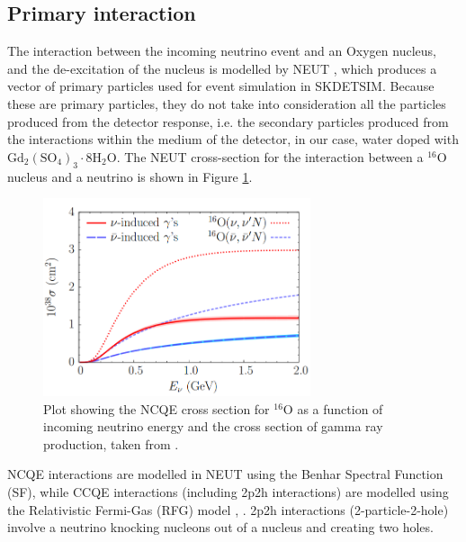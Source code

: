 \subsection{Primary interaction}

The interaction between the incoming neutrino event and an Oxygen nucleus, and the de-excitation of the nucleus is modelled by NEUT \cite{abe2014measurement}, which produces a vector of primary particles used for event simulation in SKDETSIM. Because these are primary particles, they do not take into consideration all the particles produced from the detector response, i.e. the secondary particles produced from the interactions within the medium of the detector, in our case, water doped with $\mathrm{Gd}_{2}\left(\mathrm{SO}_{4}\right)_{3} \cdot 8 \mathrm{H}_{2} \mathrm{O}$. The NEUT cross-section for the interaction between a ${ }^{16} \mathrm{O}$ nucleus and a neutrino is shown in Figure \ref{fig:neutrinonuc}. 

\begin{figure}[htp]
    \centering
    \includegraphics[width=0.7\textwidth]{Figures/neutrinonuc.png}
    \caption{Plot showing the NCQE cross section for ${ }^{16} \mathrm{O}$ as a function of incoming neutrino energy and the cross section of gamma ray production, taken from \cite{neutrino_nuc}.}
\label{fig:neutrinonuc}
\end{figure}
 

 NCQE interactions are modelled in NEUT using the Benhar Spectral Function (SF), while CCQE interactions (including 2p2h interactions) are modelled using the Relativistic Fermi-Gas (RFG) model \cite{benhar_electron-_2005}, \cite{rfg_model}. 2p2h interactions (2-particle-2-hole) involve a neutrino knocking nucleons out of a nucleus and creating two holes.


